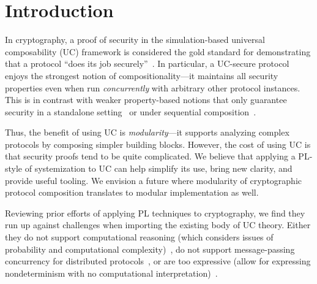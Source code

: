 \section{Introduction}
\label{sec:introduction}

In cryptography, a proof of security in the simulation-based universal composability (UC)
framework is considered the gold standard for demonstrating that a protocol ``does its job
securely''~\cite{canetti2001universally}. In particular, a UC-secure protocol
enjoys the strongest notion of compositionality---it maintains all security
properties even when run \emph{concurrently} with arbitrary other protocol instances.
This is in contrast with weaker property-based notions that only guarantee security in a standalone
setting~\cite{lindell2014introduction} or under sequential
composition~\cite{goldreich1987play}.
%
\begin{comment}
In a nutshell, security proofs in UC follow the real/ideal
paradigm~\cite{goldreich1987play}. The security requirements of a given task are
defined as a program for a \emph{single trusted process} called an \emph{ideal
  functionality}, which runs in an imagined ideal world. This serves as a
specification of the desired security properties for a distributed protocol
achieving the task across \emph{many unstrusted processes}, which runs in the
real world. Roughly speaking, we say that a protocol $\pi$ \emph{emulates} an
ideal functionality $\mc{F}$ (i.e., it meets its specification) if every
adversarial behavior in the real world can also be exhibited in the ideal world.
\end{comment}
%
Thus, the benefit of using UC is
\emph{modularity}---it supports analyzing complex protocols by composing simpler
building blocks.
However, the cost of using UC is that security proofs tend to be quite
complicated.
We believe that applying a PL-style of systemization to UC can help
simplify its use, bring new clarity, and provide useful tooling.
We envision a future where modularity of cryptographic protocol composition
translates to modular implementation as well.

Reviewing prior efforts of applying PL techniques to cryptography,
we find they run up against challenges when importing the existing
body of UC theory.
Either they do not support
computational reasoning (which considers issues of probability and computational
complexity)~\cite{bohl2016symbolic}, do not support message-passing concurrency for distributed protocols~\cite{barthe2011computer},
or are too expressive (allow for expressing nondeterminism with no computational interpretation)~\cite{abadi1999calculus}.

